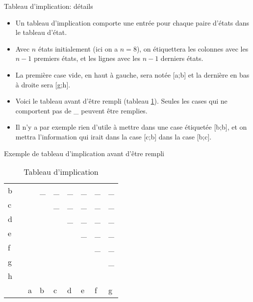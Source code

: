 \documentclass[presentation]{beamer}
\begin{document}
\begin{frame}[label={sec:orgc085009}]{Tableau d'implication: détails}
\begin{itemize}
\item Un tableau d'implication comporte une entrée pour chaque paire d'états dans le tableau d'état.

\item Avec \(n\) états initialement (ici on a \(n=8\)), on étiquettera les colonnes avec les \(n-1\) premiers états, et les lignes avec les \(n-1\) derniers états.

\item La première case vide, en haut à gauche, sera notée [a;b] et la dernière en bas à droite sera [g;h].

\item Voici le tableau avant d'être rempli (tableau \ref{tab:orgd0fd5da}).  Seules les cases qui ne comportent pas de \_ peuvent être remplies.

\item Il n'y a par exemple rien d'utile à mettre dans une case étiquetée [b;b], et on mettra l'information qui irait dans la case [c;b] dans la case [b;c].
\end{itemize}
\end{frame}

\begin{frame}[label={sec:org4d466a0}]{Exemple de tableau d'implication avant d'être rempli}
\begin{table}[htbp]
\caption{\label{tab:orgd0fd5da}Tableau d'implication}
\centering
\begin{tabular}{lllllllll}
b &  &  & \_ & \_ & \_ & \_ & \_ & \_\\
c &  &  &  & \_ & \_ & \_ & \_ & \_\\
d &  &  &  &  & \_ & \_ & \_ & \_\\
e &  &  &  &  &  & \_ & \_ & \_\\
f &  &  &  &  &  &  & \_ & \_\\
g &  &  &  &  &  &  &  & \_\\
h &  &  &  &  &  &  &  & \\
\hline
 &  & a & b & c & d & e & f & g\\
\end{tabular}
\end{table}
\end{frame}
\end{document}

